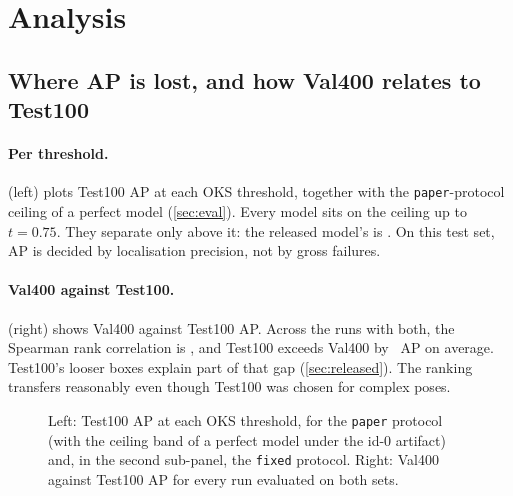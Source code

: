 \section{Analysis}\label{sec:analysis}

\subsection{Where AP is lost, and how Val400 relates to Test100}\label{sec:thresholds}

\paragraph{Per threshold.}  (left) plots Test100 AP at each OKS threshold, together with the \texttt{paper}-protocol ceiling of a perfect model (\cref{sec:eval}).
Every model sits on the ceiling up to $t=0.75$. They separate only above it: the released model's \APstrict{} is .
On this test set, AP is decided by localisation precision, not by gross failures.

\paragraph{Val400 against Test100.}  (right) shows Val400 against Test100 AP. Across the  runs with both, the Spearman rank correlation is , and Test100 exceeds Val400 by ~AP on average.
Test100's looser boxes explain part of that gap (\cref{sec:released}). The ranking transfers reasonably even though Test100 was chosen for complex poses.

\begin{figure}[t]
  \centering
  \begin{minipage}[b]{0.63\linewidth}\centering
  \end{minipage}\hfill
  \begin{minipage}[b]{0.33\linewidth}\centering
  \end{minipage}
  \caption{Left: Test100 AP at each OKS threshold, for the \texttt{paper} protocol (with the ceiling band of a perfect model under the id-0 artifact) and, in the second sub-panel, the \texttt{fixed} protocol. Right: Val400 against Test100 AP for every run evaluated on both sets.}
  \label{fig:thresholds}\label{fig:valtest}
\end{figure}

